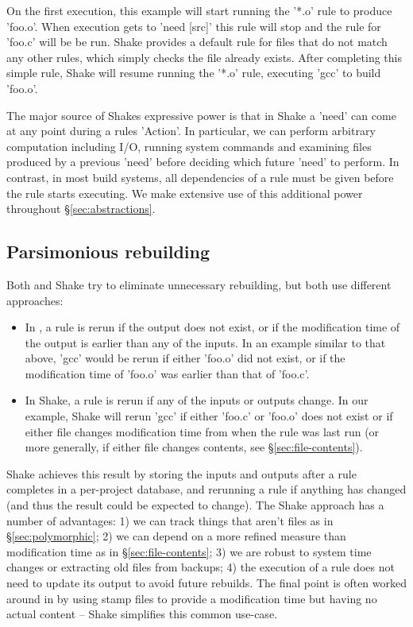 On the first execution, this example will start running the \lst'*.o' rule to produce \lst'foo.o'. When execution gets to \lst'need [src]' this rule will stop and the rule for \lst'foo.c' will be be run. Shake provides a default rule for files that do not match any other rules, which simply checks the file already exists. After completing this simple rule, Shake will resume running the \lst'*.o' rule, executing \lst'gcc' to build \lst'foo.o'.

The major source of Shakes expressive power is that in Shake a \lst'need' can come at any point during a rules \lst'Action'. In particular, we can perform arbitrary computation including I/O, running system commands and examining files produced by a previous \lst'need' before deciding which future \lst'need' to perform. In contrast, in most build systems, all dependencies of a rule must be given before the rule starts executing. We make extensive use of this additional power throughout \S\ref{sec:abstractions}.

\subsection{Parsimonious rebuilding}

Both \make{} and Shake try to eliminate unnecessary rebuilding, but both use different approaches:

\begin{itemize}
\item In \make{}, a rule is rerun if the output does not exist, or if the modification time of the output is earlier than any of the inputs. In an example similar to that above, \lst'gcc' would be rerun if either \lst'foo.o' did not exist, or if the modification time of \lst'foo.o' was earlier than that of \lst'foo.c'.
\item In Shake, a rule is rerun if any of the inputs or outputs change. In our example, Shake will rerun \lst'gcc' if either \lst'foo.c' or \lst'foo.o' does not exist or if either file changes modification time from when the rule was last run (or more generally, if either file changes contents, see \S\ref{sec:file-contents}).
\end{itemize}

Shake achieves this result by storing the inputs and outputs after a rule completes in a per-project database, and rerunning a rule if anything has changed (and thus the result could be expected to change). The Shake approach has a number of advantages: 1) we can track things that aren't files as in \S\ref{sec:polymorphic}; 2) we can depend on a more refined measure than modification time as in \S\ref{sec:file-contents}; 3) we are robust to system time changes or extracting old files from backups; 4) the execution of a rule does not need to update its output to avoid future rebuilds. The final point is often worked around in \make{} by using stamp files to provide a modification time but having no actual content -- Shake simplifies this common use-case.

